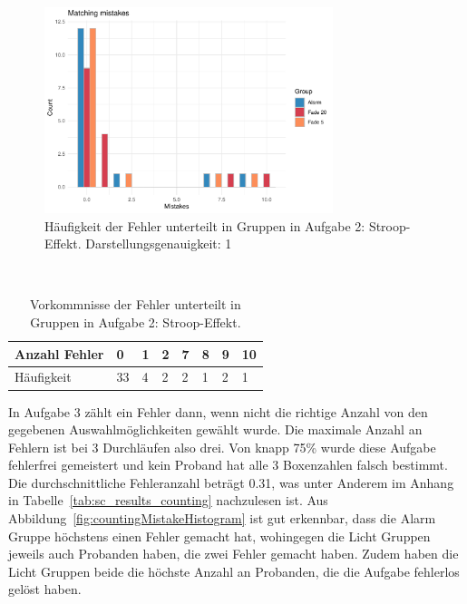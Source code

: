 
\begin{figure}[H]
	\centering
	\includegraphics[width=0.75\textwidth]{./_StudyResults/matchingMisHist}
	\caption{Häufigkeit der Fehler unterteilt in Gruppen in Aufgabe 2: Stroop-Effekt. Darstellungsgenauigkeit: 1}
	\label{fig:matchingMistakeHistogram}
\end{figure}

\begin{table}
	\caption{Vorkommnisse der Fehler unterteilt in Gruppen in Aufgabe 2: Stroop-Effekt.}~\label{tab:matchingMistakeNumbers}
	
	\setlength\tabcolsep{3pt}
	\renewcommand{\arraystretch}{1.4}%
	\begin{tabularx}{\textwidth}{ | l | x | x | x | x | x | x | x | }
		\hline
		Anzahl Fehler & 0   & 1  & 2  & 7  & 8  & 9 & 10 \\ \hline\hline
		Häufigkeit 	  & 33  & 4  & 2  & 2  & 1  & 2 & 1  \\ \hline
	\end{tabularx}
\end{table}

In Aufgabe 3 zählt ein Fehler dann, wenn nicht die richtige Anzahl von den gegebenen Auswahlmöglichkeiten gewählt wurde. Die maximale Anzahl an Fehlern ist bei 3 Durchläufen also drei.
Von knapp 75\% wurde diese Aufgabe fehlerfrei gemeistert und kein Proband hat alle 3 Boxenzahlen falsch bestimmt. Die durchschnittliche Fehleranzahl beträgt 0.31, was unter Anderem im Anhang in Tabelle~\ref{tab:sc_results_counting} nachzulesen ist.
Aus Abbildung~\ref{fig:countingMistakeHistogram} ist gut erkennbar, dass die Alarm Gruppe höchstens einen Fehler gemacht hat, wohingegen die Licht Gruppen jeweils auch Probanden haben, die zwei Fehler gemacht haben. Zudem haben die Licht Gruppen beide die höchste Anzahl an Probanden, die die Aufgabe fehlerlos gelöst haben.

